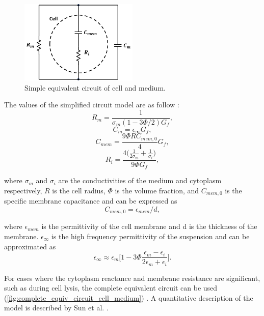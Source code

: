 \begin{figure}
     \centering
     \includegraphics[width=0.5\textwidth]{images/simpleCellMediumCircuit.png}
     \caption{Simple equivalent circuit of cell and medium.}
     \label{fig:simple_equiv_circuit_cell_medium}
 \end{figure}
 
 \noindent The values of the simplified circuit model are as follow \cite{morgan_single_2007}:
 \begin{equation}
     R_m = \frac{1}{\sigma_m(1-3\Phi/2)G_f},
 \end{equation}
 \begin{equation}
     C_m = \epsilon_\infty G_f,
 \end{equation}
 \begin{equation}
     C_{mem} = \frac{9\Phi RC_{mem,0}}{4}G_f,
 \end{equation}
 \begin{equation}
     R_i = \frac{4\Big(\frac{1}{2\sigma_m}+\frac{1}{\sigma_i}\Big)}{9\Phi G_f},
 \end{equation}
 
 \noindent where $\sigma_m$ and $\sigma_i$ are the conductivities of the medium and cytoplasm respectively, $R$ is the cell radius, $\Phi$ is the volume fraction, and $C_{mem,0}$ is the specific membrane capacitance and can be expressed as \cite{sun_single-cell_2010}
 \begin{equation}
   C_{mem,0} = \epsilon_{mem}/d,
 \end{equation}
 
 \noindent where $\epsilon_{mem}$ is the permittivity of the cell membrane and d is the thickness of the membrane. $\epsilon_\infty$ is the high frequency permittivity of the suspension and can be approximated as
 \begin{equation}
     \epsilon_\infty \approx \epsilon_m \bigg[1-3\Phi\frac{\epsilon_m-\epsilon_i}{2\epsilon_m+\epsilon_i}\bigg].
 \end{equation}
 
 \par For cases where the cytoplasm reactance and membrane resistance are significant, such as during cell lysis, the complete equivalent circuit can be used (\ref{fig:complete_equiv_circuit_cell_medium}) \cite{sun_single-cell_2010}. A quantitative description of the model is described by Sun et al. \cite{sun_dielectric_2007}.

